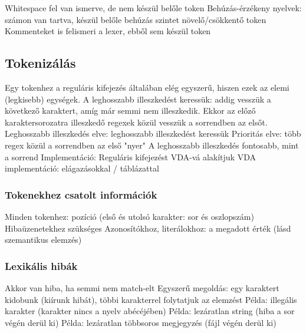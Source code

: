 \documentclass[12pt,a4paper]{article}
\begin{document}
\begin{outline}
	\1 Whitespace fel van ismerve, de nem készül belőle token
	\1 Behúzás-érzékeny nyelvek: számon van tartva, készül belőle behúzás szintet növelő/csökkentő token
	\1 Kommenteket is felismeri a lexer, ebből sem készül token
\end{outline}

\subsection{Tokenizálás}

\begin{outline}
	\1 Egy tokenhez a reguláris kifejezés általában elég egyszerű, hiszen ezek az elemi (legkisebb) egységek.
	\1 A leghosszabb illeszkedést keressük: addig vesszük a következő karaktert, amíg már semmi nem illeszkedik. Ekkor az előző karaktersorozatra illeszkedő regexek közül vesszük a sorrendben az elsőt.
		\2 Leghosszabb illeszkedés elve: leghosszabb illeszkedést keressük
		\2 Prioritás elve: több regex közül a sorrendben az első "nyer"
		\2 A leghosszabb illeszkedés fontosabb, mint a sorrend
	\1 Implementáció:
		\2 Reguláris kifejezést VDA-vá alakítjuk
		\2 VDA implementáció: elágazásokkal / táblázattal
\end{outline}

\pagebreak

\subsubsection{Tokenekhez csatolt információk}

\begin{outline}
	\1 Minden tokenhez: pozíció (első és utolsó karakter: sor és oszlopszám)
		\2 Hibaüzenetekhez szükséges
	\1 Azonosítókhoz, literálokhoz: a megadott érték (lásd szemantikus elemzés)
\end{outline}

\subsubsection{Lexikális hibák}

\begin{outline}
	\1 Akkor van hiba, ha semmi nem match-elt
	\1 Egyszerű megoldás: egy karaktert kidobunk (kiírunk hibát), többi karakterrel folytatjuk az elemzést
	\1 Példa: illegális karakter (karakter nincs a nyelv abécéjében)
	\1 Példa: lezáratlan string (hiba a sor végén derül ki)
	\1 Példa: lezáratlan többsoros megjegyzés (fájl végén derül ki)
\end{outline}
\end{document}
